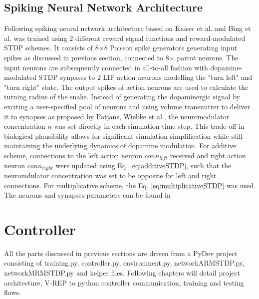 \subsection{Spiking Neural Network Architecture}
Following spiking neural network architecture based on Kaiser et al. \cite{7} and Bing et al. \cite{8} was trained using 2 different reward signal functions and reward-modulated STDP schemes. It consists of 8\(\times\)8 Poisson spike generators generating input spikes as discussed in previous section, connected to 8\(\times\) parrot neurons. The input neurons are subsequently connected in all-to-all fashion with dopamine-modulated STDP synpases to 2 LIF action neurons modelling the "turn left" and "turn right" state. The output spikes of action neurons are used to calculate the turning radius of the snake. Instead of generating the dopaminergic signal by exciting a user-specified pool of neurons and using volume transmitter to deliver it to synapses as proposed by Potjans, Wiebke et al.\cite{10}, the neuromodulator concentration \(n\) was set directly in each simulation time step. This trade-off in biological plausibility allows for significant simulation simplification while still maintaining the underlying dynamics of dopamine modulation. For additive scheme, connections to the left action neuron \(conn_{left}\) received and right action neuron \(conn_{right}\) were updated using Eq. \ref{eq:additiveSTDP}, such that the neuromdulator concentration was set to be opposite for left and right connections. For multiplicative scheme, the Eq. \ref{eq:multiplicativeSTDP} was used. The neurons and synapses parameters can be found in 


\section{Controller}\label{controller}
All the parts discussed in previous sections are driven from a PyDev project consisting of training.py, controller.py, environment.py, networkARMSTDP.py, networkMRMSTDP.py and helper files. Following chapters will detail project architecture, V-REP to python controller communication, training and testing flows.

